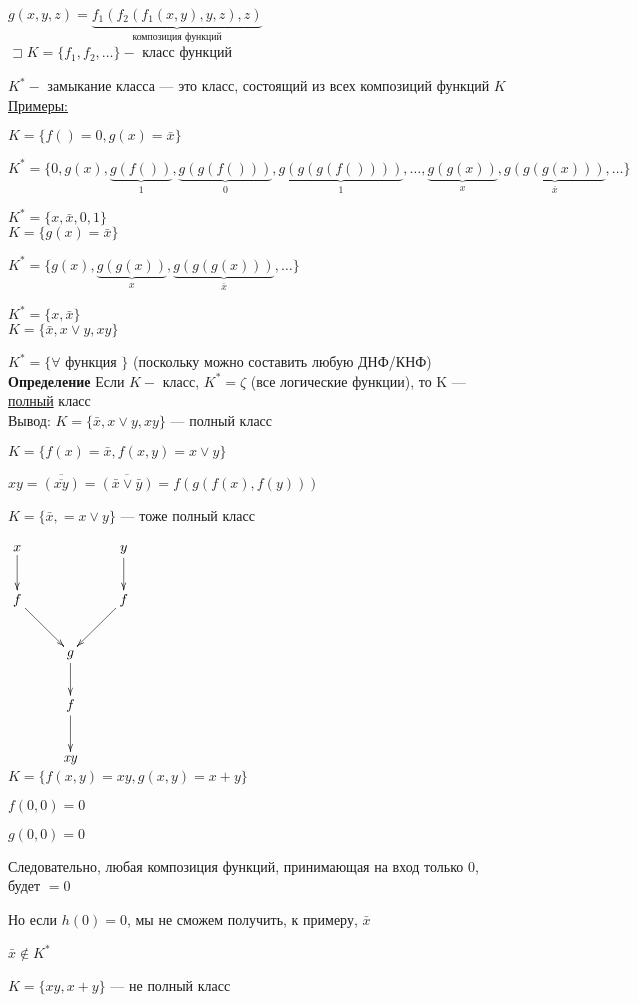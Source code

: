 \documentclass[a4paper, 12pt] {article}
\begin{document}
$ g(x, y, z) = \underbrace{f_{1}(f_{2}(f_{1}(x, y), y, z),z)}_{\text{композиция функций}} $\\

$ \sqsupset K = \{ f_{1 }, f_{2} , \dots\} -$ класс функций

$ K^{*} -$ замыкание класса --- это класс, состоящий из всех композиций функций $ K $\\

\underline{Примеры:}

$ K = \{ f() = 0, g(x) = \bar x\} $

$ K^{*} = \{ 0, g(x), \underbrace{g(f())}_1, \underbrace{g(g(f()))}_0, \underbrace{g(g(g(f())))}_1, \dots, \underbrace{g(g(x))}_x, \underbrace{g(g(g(x)))}_{\bar x}, \dots \} $

$ K^{*} = \{x, \bar x, 0, 1\} $\\

$ K = \{  g(x) = \bar x\} $

$ K^{*} = \{ g(x), \underbrace{g(g(x))}_x, \underbrace{g(g(g(x)))}_{\bar x}, \dots \} $

$ K^{*} = \{x, \bar x\} $\\

$ K = \{ \bar x, x \vee y, xy\} $

$ K^{*} = \{ \forall$ функция $\} $ (поскольку можно составить любую ДНФ/КНФ)\\

\textbf{ Определение} Если $ K -$ класс, $ K^{*}= \zeta $ (все логические функции), то K --- \underline{полный} класс\\

Вывод: $ K = \{ \bar x, x \vee y, xy\} $ --- полный класс

$ K = \{ f(x) = \bar x, f(x, y) = x \vee y\} $

$ xy = \overline{(\overline{xy})} = \overline{(\bar x \vee \bar y)} = f(g(f(x), f(y)))$

$ K = \{ \bar x, = x \vee y\} $ --- тоже полный класс

$ \begin{matrix}
	\xymatrix{
		x \ar@{->}[d] & & y \ar@{->}[d]  \\
		f \ar@{->}[dr] & & f \ar@{->}[dl] \\
		& g \ar@{->}[d] \\
		& f \ar@{->}[d] \\
		& \text{\textit{xy}} \\
	}
\end{matrix} $\\

$ K = \{ f(x, y) = xy, g(x, y) = x + y\} $

$ f(0, 0) = 0 $

$ g(0, 0) = 0 $

Следовательно, любая композиция функций, принимающая на вход только 0, будет $ =0 $

Но если $ h(0)=0 $, мы не сможем получить, к примеру, $ \bar x $

$ \bar x \notin K^{*}$

$ K = \{  xy, x + y\} $ --- не полный класс
 
\end{document}
